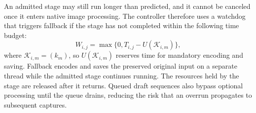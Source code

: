 An admitted stage may still run longer than predicted, and it cannot be canceled once it enters native image processing.
The controller therefore uses a watchdog that triggers fallback if the stage has not completed within the following time budget:
\begin{equation*}
  W_{i,j}=\max\{0,T_{i,j}-U(\mathcal{K}_{i,m})\},
\end{equation*}
where \(\mathcal{K}_{i,m}=(k_m)\), so \(U(\mathcal K_{i,m})\) reserves time for mandatory encoding and saving.
Fallback encodes and saves the preserved original input on a separate thread while the admitted stage continues running.
The resources held by the stage are released after it returns.
Queued draft sequences also bypass optional processing until the queue drains, reducing the risk that an overrun propagates to subsequent captures.

